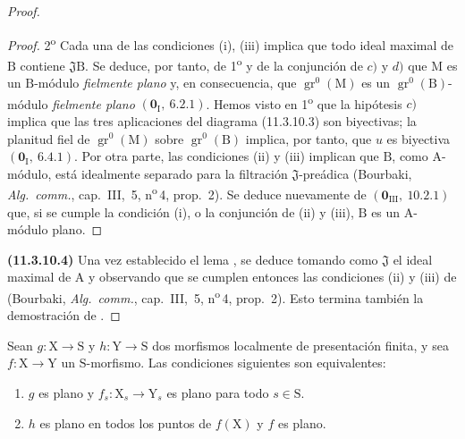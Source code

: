 \begin{proof}
\begin{proof}
2\textsuperscript{o} Cada una de las condiciones (i), (iii) implica que todo ideal maximal de $\mathrm{B}$ contiene $\mathfrak{J}\mathrm{B}$. Se deduce, por tanto, de 1\textsuperscript{o} y de la conjunción de $c)$ y $d)$ que $\mathrm{M}$ es un $\mathrm{B}$-módulo \emph{fielmente plano} y, en consecuencia, que $\operatorname{gr}^0(\mathrm{M})$ es un $\operatorname{gr}^0(\mathrm{B})$-módulo \emph{fielmente plano} $(\mathbf{0}_{\mathrm{I}},~6.2.1)$. Hemos visto en 1\textsuperscript{o} que la hipótesis $c)$ implica que las tres aplicaciones del diagrama \textup{(11.3.10.3)} son biyectivas; la planitud fiel de $\operatorname{gr}^0(\mathrm{M})$ sobre $\operatorname{gr}^0(\mathrm{B})$ implica, por tanto, que $u$ es biyectiva $(\mathbf{0}_{\mathrm{I}},~6.4.1)$. Por otra parte, las condiciones (ii) y (iii) implican que $\mathrm{B}$, como $\mathrm{A}$-módulo, está idealmente separado para la filtración $\mathfrak{J}$-preádica (Bourbaki, \emph{Alg.\ comm.}, cap.~III, \textsection\,5, n\textsuperscript{o}\,4, prop.~2). Se deduce nuevamente de $(\mathbf{0}_{\mathrm{III}},~10.2.1)$ que, si se cumple la condición (i), o la conjunción de (ii) y (iii), $\mathrm{B}$ es un $\mathrm{A}$-módulo plano.
\end{proof}

\label{IV.11.3.10.4}
\textbf{(11.3.10.4)} Una vez establecido el lema , se deduce  tomando como $\mathfrak{J}$ el ideal maximal de $\mathrm{A}$ y observando que se cumplen entonces las condiciones (ii) y (iii) de  (Bourbaki, \emph{Alg.\ comm.}, cap.~III, \textsection\,5, n\textsuperscript{o}\,4, prop.~2). Esto termina también la demostración de .
\end{proof}

\begin{corollary}[11.3.11]
\label{IV.11.3.11}
Sean $g:\mathrm{X}\to\mathrm{S}$ y $h:\mathrm{Y}\to\mathrm{S}$ dos morfismos localmente de presentación finita, y sea $f:\mathrm{X}\to\mathrm{Y}$ un $\mathrm{S}$-morfismo. Las condiciones siguientes son equivalentes:
\begin{enumerate}[label=\emph{\alph*)}]
  \item $g$ es plano y $f_s:\mathrm{X}_s\to\mathrm{Y}_s$ es plano para todo $s\in\mathrm{S}$.
  \item $h$ es plano en todos los puntos de $f(\mathrm{X})$ y $f$ es plano.
\end{enumerate}
\end{corollary}

